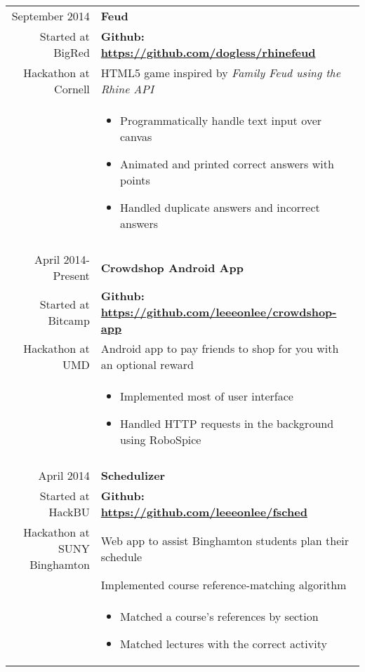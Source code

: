 \documentclass[letterpaper,10pt]{article} %
\begin{document}
\begin{longtable}{r|p{4.5in}}
    September 2014 & \textbf{Feud} \\
    Started at BigRed  & \textbf{Github: \url{https://github.com/dogless/rhinefeud}} \\
    Hackathon at Cornell & HTML5 game inspired by \em{Family Feud} using the Rhine API \\
    & \begin{itemize}
        \item Programmatically handle text input over canvas
        \item Animated and printed correct answers with points
        \item Handled duplicate answers and incorrect answers
    \end{itemize} \\

    \multicolumn{2}{c}{} \\

    April 2014-Present & \textbf{Crowdshop Android App} \\
    Started at Bitcamp & \textbf{Github: \url{https://github.com/leeeonlee/crowdshop-app}} \\
    Hackathon at UMD & Android app to pay friends to shop for you with an optional reward \\
    & \begin{itemize}
        \item Implemented most of user interface
        \item Handled HTTP requests in the background using RoboSpice
    \end{itemize} \\

    \multicolumn{2}{c}{} \\

    April 2014 & \textbf{Schedulizer} \\
    Started at HackBU & \textbf{Github: \url{https://github.com/leeeonlee/fsched}} \\
    Hackathon at SUNY Binghamton & Web app to assist Binghamton students plan their schedule \\
    & Implemented course reference-matching algorithm \\ 
    & \begin{itemize}
        \item Matched a course's references by section
        \item Matched lectures with the correct activity
    \end{itemize}
\end{longtable}
\end{document}
